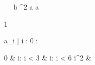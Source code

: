 \begin{eqcode}{\mu}{\ }{\ }{}
  b ^2 \lend
  a \in {} \lend
  a \gets 
  \begin{tmatrix}
    1   \lend
  \end{tmatrix} \lend
   \lend  %
  a_i | i : 0 \leq i  \gets
  \begin{cases}
    0 & i: i < 3  & i: i < 6 \lend
    i^2 & \otherwise \lend
  \end{cases}\lend
   \lend %
   \lend
\end{eqcode}
